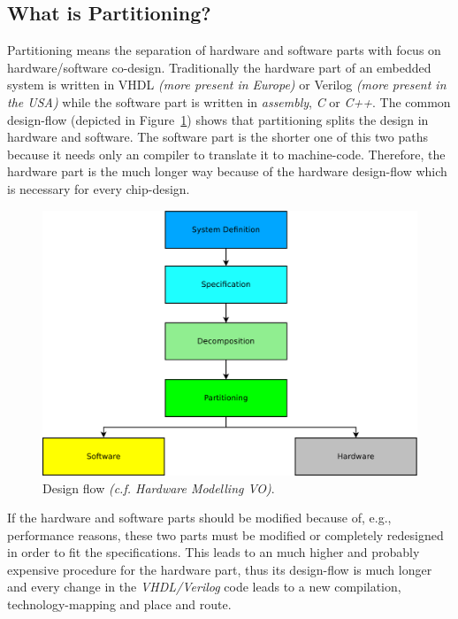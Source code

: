 \documentclass{article}
\begin{document}
	  \subsection{What is Partitioning?}
	  Partitioning means the separation of hardware and software parts with focus on hardware/software co-design.
	  Traditionally the hardware part of an embedded system is written in VHDL \textit{(more present in Europe)} or Verilog \textit{(more present in the USA)} while the software part is written in \textit{assembly}, \textit{C} or \textit{C++}.
	  The common design-flow (depicted in Figure~\ref{fig:flow}) shows that partitioning splits the design in hardware and software.
	  The software part is the shorter one of this two paths because it needs only an compiler to translate it to machine-code. Therefore, the hardware part is the much longer way because of the hardware design-flow which is necessary for every chip-design.
	    \begin{figure}[hp]
	      \centering
	      \includegraphics[scale=0.18]{../pictures/flow.pdf}
	      \caption{Design flow \textit{(c.f. Hardware Modelling VO)}.}
	      \label{fig:flow}
	    \end{figure}  
	  If the hardware and software parts should be modified because of, e.g., performance reasons, these two parts must be modified or completely redesigned in order to fit the specifications.
	  This leads to an much higher and probably expensive procedure for the hardware part, thus its design-flow is much longer and every change in the \textit{VHDL/Verilog} code leads to a new compilation, technology-mapping and place and route.
\end{document}
